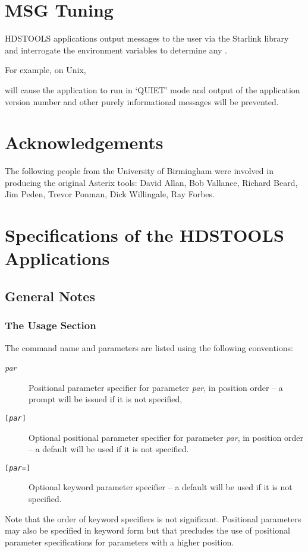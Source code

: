 \documentclass[twoside,11pt,nolof]{starlink}
\begin{document}
\section{MSG Tuning}
HDSTOOLS applications output messages to the user via the Starlink
library and interrogate the environment variables to determine any
.

For example, on Unix,
\begin{terminalv}
\end{terminalv}
will cause the application to run in `QUIET' mode and output of the application
version number and other purely informational messages will be prevented.

\section{Acknowledgements}
The following people from the University of Birmingham were involved in
producing the original Asterix tools: David Allan, Bob Vallance, Richard Beard,
Jim Peden, Trevor Ponman, Dick Willingale, Ray Forbes.

\section{Specifications of the HDSTOOLS Applications}
\subsection{General Notes}
\subsubsection{The Usage Section}
The command name and parameters are listed using the following conventions:
\begin{description}
\item[\textit{par}] Positional parameter specifier for parameter \textit{par},
in position order -- a prompt will be issued if it is not specified,
\item[\texttt{[\textit{par}]}] Optional positional parameter specifier for
parameter \textit{par}, in position order -- a default will be used if it is
not specified.
\item[\texttt{[\textit{par=}]}] Optional keyword parameter specifier -- a
default will be used if it is not specified.
\end{description}
Note that the order of keyword specifiers is not significant. Positional
parameters may also be specified in keyword form but that precludes the use of
positional parameter specifications for parameters with a higher position.
\end{document}

